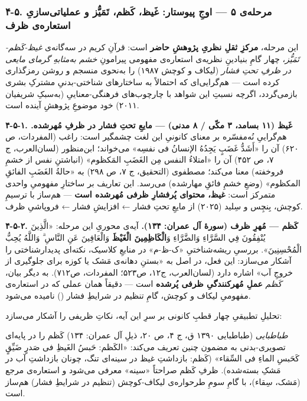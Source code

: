\begin{RTL}
\begin{otherlanguage}{persian}
\subsubsection{۴-۵. مرحله‌ی ۵ --- اوجِ پیوستار: غَیظ، کَظم، تَمَیُّز و
عملیاتی‌سازیِ استعاره‌ی
ظرف}\label{ux645ux631ux62dux644ux647ux6cc-ux6f5-ux627ux648ux62c-ux67eux6ccux648ux633ux62aux627ux631-ux63aux6ccux638-ux6a9ux638ux645-ux62aux645ux6ccux632-ux648-ux639ux645ux644ux6ccux627ux62aux6ccux633ux627ux632ux6cc-ux627ux633ux62aux639ux627ux631ux647ux6cc-ux638ux631ux641}

این مرحله، \textbf{مرکزِ ثقلِ نظریِ پژوهشِ حاضر} است: قرآنِ کریم در سه‌گانه‌ی
\emph{غیظ-کَظم-تَمَیُّز}، چهار گامِ بنیادینِ نظریه‌ی استعاره‌ی مفهومی پیرامونِ
\emph{خشم به‌مثابهِ گرمای مایعی در ظرفِ تحتِ فشار} (لیکاف و کوچش ۱۹۸۷) را
به‌نحوی منسجم و روشن رمزگذاری کرده است --- هم‌گرایی‌ای که احتمالاً به
ساختارهای شناختی-بدنیِ مشترکِ بشری بازمی‌گردد، اگرچه نسبتِ این شواهد با
چارچوب‌های فرهنگی-معناییِ  (به‌سبکِ شریفیان
۲۰۱۱) خود موضوعِ پژوهشِ آینده است.

\textbf{۴-۵-۱. غَیظ (۱۱ بسامد، ۳ مکّی / ۸ مدنی) --- مایعِ تحتِ فشار در ظرفِ
مُهرشده.} هم‌گراییِ نُه‌مفسّره بر معنای کانونیِ این لغت چشمگیر است: راغب
(المفردات، ص ۶۲۰) آن را «أَشَدُّ غَضَبٍ یَجِدُهُ الإنسانُ فی نفسِه» می‌خواند؛ ابن‌منظور
(لسان‌العرب، ج ۷، ص ۴۵۲) آن را «امتلاءُ النفس مِن الغَضَبِ المَکظوم» (انباشتنِ
نفس از خشمِ فروخفته) معنا می‌کند؛ مصطفوی (التحقیق، ج ۷، ص ۲۹۸) به «حالةُ
الغَضَبِ الفائقِ المکظوم» (وضعِ خشمِ فائقِ مهارشده) می‌رسد. این تعاریف بر ساختارِ
مفهومیِ واحدی متمرکز است: \textbf{غیظ، محتوای پُرفشارِ ظرفی مُهرشده است} ---
هم‌ساز با ترسیمِ کوچش، بِنچِس و سِلید (۲۰۲۵) از مایعِ تحتِ فشار ← افزایشِ فشار ←
فروپاشیِ ظرف.

\textbf{۴-۵-۲. کَظم --- مُهرِ ظرف (سورۀ آل عمران: ۱۳۴).} آیه‌ی محوریِ این
مرحله: «الَّذِينَ يُنْفِقُونَ فِي السَّرَّاءِ وَالضَّرَّاءِ وَ\textbf{الْكَاظِمِينَ الْغَيْظَ} وَالْعَافِينَ
عَنِ النَّاسِ ۗ وَاللَّهُ يُحِبُّ الْمُحْسِنِينَ». بررسیِ ریشه‌شناختیِ «ک-ظ-م» در منابعِ
کلاسیک، نکته‌ای پدیدارشناختی را آشکار می‌سازد: این فعل، در اصل به «بستنِ
دهانه‌ی مَشک یا کوزه برای جلوگیری از خروجِ آب» اشاره دارد (لسان‌العرب، ج۱۲،
ص۵۲۳؛ المفردات، ص۷۱۲). به دیگر بیان، \emph{کَظم} \textbf{عملِ مُهرکنندگیِ
ظرفی پُرشده} است --- دقیقاً همان عملی که در استعاره‌ی مفهومیِ لیکاف و کوچش،
گامِ تنظیم در شرایطِ فشار () نامیده می‌شود.

تحلیلِ تطبیقیِ چهار قطبِ کانونی بر سرِ این آیه، نکاتِ ظریفی را آشکار می‌سازد:

\emph{طباطبایی} (طباطبایی ۱۳۹۰ ق، ج ۴، ص ۲۰، ذیلِ آل عمران: ۱۳۴) کَظم را
در پایه‌ای تصویری-بدنی به مضمون چنین تعریف می‌کند: «الکَظم: حَبسُ الغَیظِ فی
صَدرٍ ضَیِّقٍ کَحَبسِ الماءِ فی السِّقاء» (کَظم: بازداشتِ غیظ در سینه‌ای تنگ، چونان
بازداشتِ آب در مَشکِ بسته‌شده). ظرفِ کَظم صراحتاً «سینه» معرفی می‌شود و استعاره‌ی
مرجع (مَشک، سِقاء)، با گامِ سومِ طرحواره‌ی لیکاف-کوچش (تنظیم در شرایطِ فشار)
هم‌ساز است.


\end{otherlanguage}
\end{RTL}
